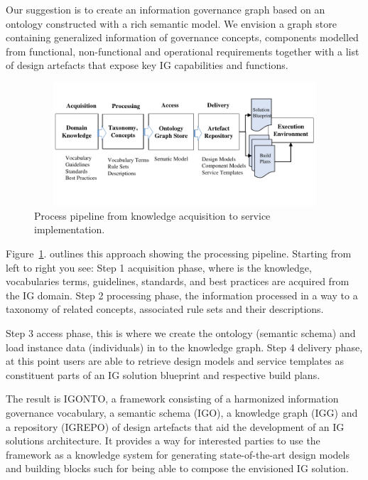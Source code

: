 \documentclass[runningheads]{llncs}
\begin{document}
Our suggestion is to create an information governance graph based on an ontology constructed with a rich semantic model. We envision a graph store containing generalized information of governance concepts, components modelled from functional, non-functional and operational requirements together with a list of design artefacts that expose key IG capabilities and functions.

 \begin{figure} [h]
\includegraphics[page=1,trim=0 1cm 0 0,clip, width=345pt, height=130pt]{IGSModelsMedium.pdf}
\caption{Process pipeline from knowledge acquisition to service implementation.} \label{fig1}
\vspace{-10pt}
\end{figure}

Figure~\ref{fig1}. outlines this approach showing the processing pipeline. Starting from left to right you see: Step 1 acquisition phase, where is the knowledge, vocabularies terms, guidelines, standards, and best practices are acquired from the IG domain. Step 2 processing phase, the information processed in a way to a taxonomy of related concepts, associated rule sets and their descriptions.  

Step 3 access phase, this is where we create the ontology (semantic schema) and load instance data (individuals) in to the knowledge graph. Step 4 delivery phase, at this point users are able to retrieve design models and service templates as constituent parts of an IG solution blueprint and respective build plans. 

The result is IGONTO, a framework consisting of a harmonized information governance vocabulary, a semantic schema (IGO), a knowledge graph (IGG) and a repository (IGREPO) of design artefacts that aid the development of an IG solutions architecture. It provides a way for interested parties to use the framework as a knowledge system for generating state-of-the-art design models and building blocks such for being able to compose the envisioned IG solution. 
\end{document}
